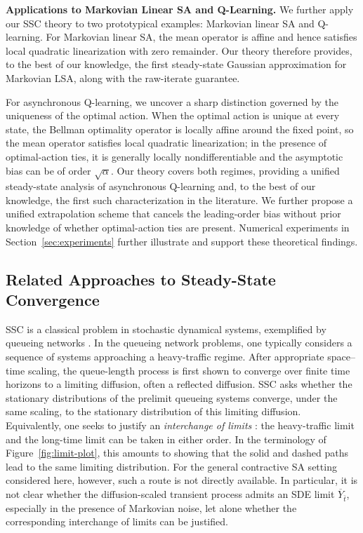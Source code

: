 \documentclass[11pt,letterpaper]{article}
\theoremstyle{plain}
\theoremstyle{definition}
\theoremstyle{remark}
\begin{document}
\noindent\textbf{Applications to Markovian Linear SA and Q-Learning.}
We further apply our SSC theory to two prototypical examples: Markovian
linear SA and Q-learning. For Markovian linear SA, the mean operator is
affine and hence satisfies local quadratic linearization with zero remainder. Our theory therefore provides, to the best of our knowledge, the first steady-state
Gaussian approximation for Markovian LSA, along with the raw-iterate guarantee.

For asynchronous Q-learning, we uncover a sharp distinction governed by
the uniqueness of the optimal action. When the optimal action is unique at
every state, the Bellman optimality operator is locally affine around
the fixed point, so the mean operator satisfies local quadratic linearization;
in the presence of optimal-action ties, it is generally
locally nondifferentiable and the asymptotic bias can be of order
\(\sqrt{\alpha}\). Our theory covers both regimes, providing a unified
steady-state analysis of asynchronous Q-learning and, to the best of our
knowledge, the first such characterization in the literature. We further
propose a unified extrapolation scheme that cancels the leading-order bias
without prior knowledge of whether optimal-action ties are present. Numerical
experiments in Section~\ref{sec:experiments} further illustrate and support
these theoretical findings.
\subsection{Related Approaches to Steady-State Convergence}
SSC is a classical problem in stochastic dynamical
systems, exemplified by queueing networks \citep{GamaZeev2006}. In the queueing network problems, one typically considers a
sequence of systems approaching a heavy-traffic regime. After appropriate
space--time scaling, the queue-length process is first shown to converge over
finite time horizons to a limiting diffusion, often a reflected diffusion.
SSC asks whether the stationary distributions of the
prelimit queueing systems converge, under the same scaling, to the stationary
distribution of this limiting diffusion. Equivalently, one seeks to justify
an \emph{interchange of limits}
\citep{GamaZeev2006,Gurv2014a,YeYao2016,YeYao2018}:
the heavy-traffic limit and the long-time limit can be taken in either order.
In the terminology of Figure~\ref{fig:limit-plot}, this amounts to showing
that the solid and dashed paths lead to the same limiting distribution. For the general contractive SA setting considered here, however, such a route is not directly
available. In particular, it is not clear  whether the
diffusion-scaled transient process admits an SDE limit
$\overline{Y}_{\bar t}$, especially in the presence of Markovian noise, let alone whether the corresponding interchange of
limits can be justified.
\end{document}
